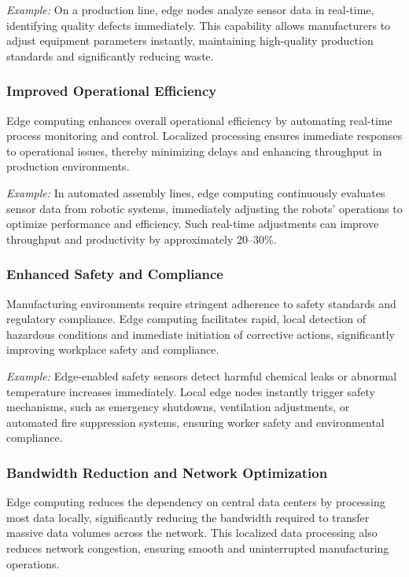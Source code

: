 \documentclass[runningheads]{llncs}
\begin{document}
\textit{Example:} On a production line, edge nodes analyze sensor data in real-time, identifying quality defects immediately. This capability allows manufacturers to adjust equipment parameters instantly, maintaining high-quality production standards and significantly reducing waste.

\subsubsection{Improved Operational Efficiency}
Edge computing enhances overall operational efficiency by automating real-time process monitoring and control. Localized processing ensures immediate responses to operational issues, thereby minimizing delays and enhancing throughput in production environments.

\textit{Example:} In automated assembly lines, edge computing continuously evaluates sensor data from robotic systems, immediately adjusting the robots' operations to optimize performance and efficiency. Such real-time adjustments can improve throughput and productivity by approximately 20–30\%.

\subsubsection{Enhanced Safety and Compliance}
Manufacturing environments require stringent adherence to safety standards and regulatory compliance. Edge computing facilitates rapid, local detection of hazardous conditions and immediate initiation of corrective actions, significantly improving workplace safety and compliance.

\textit{Example:} Edge-enabled safety sensors detect harmful chemical leaks or abnormal temperature increases immediately. Local edge nodes instantly trigger safety mechanisms, such as emergency shutdowns, ventilation adjustments, or automated fire suppression systems, ensuring worker safety and environmental compliance.

\subsubsection{Bandwidth Reduction and Network Optimization}
Edge computing reduces the dependency on central data centers by processing most data locally, significantly reducing the bandwidth required to transfer massive data volumes across the network. This localized data processing also reduces network congestion, ensuring smooth and uninterrupted manufacturing operations.
\end{document}
